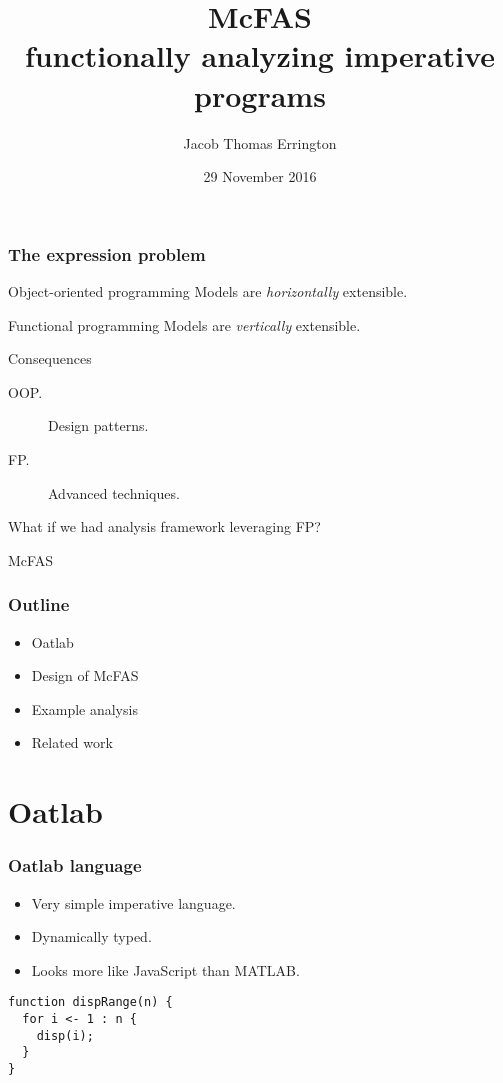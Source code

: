\documentclass{beamer}
\title{McFAS\\functionally analyzing imperative programs}
\author{Jacob Thomas Errington}
\institute{McGill University}
\date{29 November 2016}
\begin{document}
\frame{\titlepage}

\begin{frame}
  \frametitle{The expression problem}

  \pause

  \begin{block}{Object-oriented programming}
    Models are \emph{horizontally} extensible.
  \end{block}

  \begin{block}{Functional programming}
    Models are \emph{vertically} extensible.
  \end{block}

  \pause

  \begin{block}{Consequences}
    \begin{description}
      \item[OOP.] Design patterns.
      \item[FP.] Advanced techniques.
    \end{description}
  \end{block}

\end{frame}

\begin{frame}
  What if we had analysis framework leveraging FP?

  \pause

  \alert{McFAS}
\end{frame}

\begin{frame}
  \frametitle{Outline}

  \begin{itemize}
    \item Oatlab
    \item Design of McFAS
    \item Example analysis
    \item Related work
  \end{itemize}
\end{frame}

\section{Oatlab}

\begin{frame}[fragile]
  \frametitle{Oatlab language}

  \begin{itemize}
    \item Very simple imperative language.
    \item Dynamically typed.
    \item Looks more like JavaScript than MATLAB.
  \end{itemize}

  \begin{lstlisting}
function dispRange(n) {
  for i <- 1 : n {
    disp(i);
  }
}
  \end{lstlisting}
\end{frame}
\end{document}
